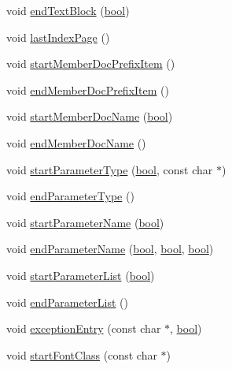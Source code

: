 \begin{DoxyCompactItemize}
\item 
void \hyperlink{class_man_generator_ae9eec8226a8e5cdf4e1f39a540bc104a}{end\+Text\+Block} (\hyperlink{qglobal_8h_a1062901a7428fdd9c7f180f5e01ea056}{bool})
\item 
void \hyperlink{class_man_generator_a20a2522333b26065dd45251026189ba0}{last\+Index\+Page} ()
\item 
void \hyperlink{class_man_generator_a4528a4f96f3c5c490534fa5df750bace}{start\+Member\+Doc\+Prefix\+Item} ()
\item 
void \hyperlink{class_man_generator_a477bbfac640dbc619568ac3a097b3e4e}{end\+Member\+Doc\+Prefix\+Item} ()
\item 
void \hyperlink{class_man_generator_a3620ad41b729c1de0d0b96c730048c50}{start\+Member\+Doc\+Name} (\hyperlink{qglobal_8h_a1062901a7428fdd9c7f180f5e01ea056}{bool})
\item 
void \hyperlink{class_man_generator_af1309137ca207483ff87c122694f83ce}{end\+Member\+Doc\+Name} ()
\item 
void \hyperlink{class_man_generator_a113e5a32a7a3bc816a3348956a41113e}{start\+Parameter\+Type} (\hyperlink{qglobal_8h_a1062901a7428fdd9c7f180f5e01ea056}{bool}, const char $\ast$)
\item 
void \hyperlink{class_man_generator_abc642fb37525e494dc01a2b9450fa516}{end\+Parameter\+Type} ()
\item 
void \hyperlink{class_man_generator_af739d0bdac7bc933cd49aac0c91733fb}{start\+Parameter\+Name} (\hyperlink{qglobal_8h_a1062901a7428fdd9c7f180f5e01ea056}{bool})
\item 
void \hyperlink{class_man_generator_a9b26c28be8f8e51f9d8c2d3bcf5af505}{end\+Parameter\+Name} (\hyperlink{qglobal_8h_a1062901a7428fdd9c7f180f5e01ea056}{bool}, \hyperlink{qglobal_8h_a1062901a7428fdd9c7f180f5e01ea056}{bool}, \hyperlink{qglobal_8h_a1062901a7428fdd9c7f180f5e01ea056}{bool})
\item 
void \hyperlink{class_man_generator_ac6c153743231aa2e67b39ce527869a8d}{start\+Parameter\+List} (\hyperlink{qglobal_8h_a1062901a7428fdd9c7f180f5e01ea056}{bool})
\item 
void \hyperlink{class_man_generator_add87f53c9277adfe77e311096b616d8d}{end\+Parameter\+List} ()
\item 
void \hyperlink{class_man_generator_ae747187a714e7c5465432a9171388804}{exception\+Entry} (const char $\ast$, \hyperlink{qglobal_8h_a1062901a7428fdd9c7f180f5e01ea056}{bool})
\item 
void \hyperlink{class_man_generator_a4bafda26799458d289c507fad6690de9}{start\+Font\+Class} (const char $\ast$)

\end{DoxyCompactItemize}
